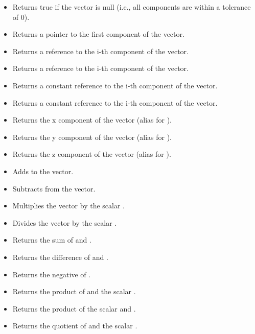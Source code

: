 \documentclass[a4paper,onecolumn,11pt]{doofus}
\begin{document}
\begin{itemize}
\item {} Returns true if the vector is null (i.e., all components are within a tolerance of 0).
\item {} Returns a pointer to the first component of the vector.
\item {} Returns a reference to the i-th component of the vector.
\item {} Returns a reference to the i-th component of the vector.
\item {} Returns a constant reference to the i-th component of the vector.
\item {} Returns a constant reference to the i-th component of the vector.
\item {} Returns the x component of the vector (alias for ).
\item {} Returns the y component of the vector (alias for ).
\item {} Returns the z component of the vector (alias for ).
\item {} Adds  to the vector.
\item {} Subtracts  from the vector.
\item {} Multiplies the vector by the scalar .
\item {} Divides the vector by the scalar .
\item {} Returns the sum of  and .
\item {} Returns the difference of  and .
\item {} Returns the negative of .
\item {} Returns the product of  and the scalar .
\item {} Returns the product of the scalar  and .
\item {} Returns the quotient of  and the scalar .

\end{itemize}
\end{document}
